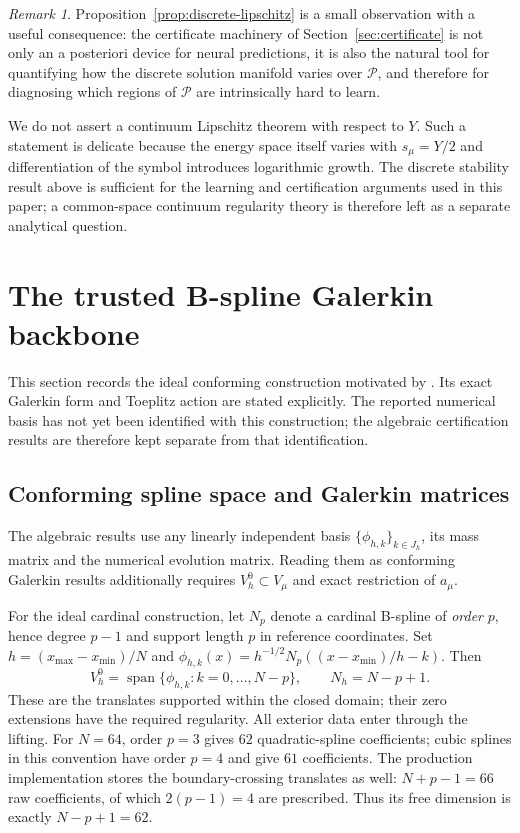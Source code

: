 \documentclass[11pt]{amsart}
\theoremstyle{remark}
\newtheorem{remark}[theorem]{Remark}
\newcommand{\Pset}{\mathcal{P}}
\begin{document}
\begin{remark}
Proposition~\ref{prop:discrete-lipschitz} is a small observation with a useful
consequence: the certificate machinery of Section~\ref{sec:certificate} is not
only an a posteriori device for neural predictions, it is also the natural
tool for quantifying how the discrete solution manifold varies over $\Pset$,
and therefore for diagnosing which regions of $\Pset$ are intrinsically hard
to learn.
\end{remark}

We do not assert a continuum Lipschitz theorem with respect to $Y$.  Such a
statement is delicate because the energy space itself varies with
$s_\mu=Y/2$ and differentiation of the symbol introduces logarithmic growth.
The discrete stability result above is sufficient for the learning and
certification arguments used in this paper; a common-space continuum
regularity theory is therefore left as a separate analytical question.

\section{The trusted B-spline Galerkin backbone}
\label{sec:galerkin}

This section records the ideal conforming construction motivated by
\cite{DamircheliCGMY2026}. Its exact Galerkin form and Toeplitz action
are stated explicitly. The reported numerical basis has not yet been
identified with this construction; the algebraic certification results are
therefore kept separate from that identification.

\subsection{Conforming spline space and Galerkin matrices}
\label{ssec:spline-space}

The algebraic results use any linearly independent basis
$\{\phi_{h,k}\}_{k\in J_h}$, its mass matrix and the numerical evolution
matrix. Reading them as conforming Galerkin results additionally requires
$V_h^0\subset V_\mu$ and exact restriction of $a_\mu$.

For the ideal cardinal construction, let $N_p$ denote a cardinal B-spline
of \emph{order} $p$, hence degree $p-1$ and support length $p$ in reference
coordinates. Set $h=(x_{\max}-x_{\min})/N$ and
$\phi_{h,k}(x)=h^{-1/2}N_p((x-x_{\min})/h-k)$. Then
\begin{equation}
 V_h^0=\operatorname{span}\{\phi_{h,k}:k=0,\ldots,N-p\},
 \qquad N_h=N-p+1.
 \label{eq:Vh}
\end{equation}
These are the translates supported within the closed domain; their zero
extensions have the required regularity. All exterior data enter through the
lifting. For $N=64$, order $p=3$ gives $62$ quadratic-spline coefficients;
cubic splines in this convention have order $p=4$ and give $61$ coefficients.
The production implementation stores the boundary-crossing translates as
well: $N+p-1=66$ raw coefficients, of which $2(p-1)=4$ are prescribed.
Thus its free dimension is exactly $N-p+1=62$.
\end{document}
